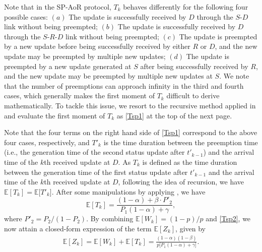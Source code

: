 \documentclass{IEEEtran}
\begin{document}
Note that in the SP-AoR protocol, $T_{k}$ behaves differently for the following four possible cases: $(a)$ The update is successfully received by $D$ through the $S$-$D$ link without being preempted; $(b)$ The update is successfully received by $D$ through the $S$-$R$-$D$ link without being preempted; $(c)$ The update is preempted by a new update before being successfully received by either $R$ or $D$, and the new update may be preempted by multiple new updates; $(d)$ The update is preempted by a new update generated at $S$ after being successfully received by $R$, and the new update may be preempted by multiple new updates at $S$. We note that the number of preemptions can approach infinity in the third and fourth cases, which generally makes the first moment of $T_{k}$ difficult to derive mathematically. To tackle this issue, we resort to the recursive method applied in \cite{b8} and evaluate the first moment of $T_{k}$ as \eqref{Tsp1} at the top of the next page.



Note that the four terms on the right hand side of \eqref{Tsp1} correspond to the above four cases, respectively, and $T'_{k}$ is the time duration between the preemption time (i.e., the generation time of the second status update after $t'_{k-1}$) and the arrival time of the $k$th received update at $D$. As $T_{k}$ is defined as the time duration between the generation time of the first status update after $t'_{k-1}$ and the arrival time of the $k$th received update at $D$, following the idea of recursion, we have $\mathbb{E}[T_{k}]=\mathbb{E}\big[T'_{k}\big]$. After some manipulations by applying \cite[Eqs. (0.112) and (0.113)]{b7}, we have
\begin{equation}\label{Tsp2}
\mathbb{E}[T_{k}]=\frac{(1-\alpha)+\beta\cdot P'_{2}}{P_{1}(1-\alpha)+\gamma},
\end{equation}
where $P'_{2} = P_{2}/(1-P_{2})$. 
By combining $\mathbb{E}[W_{k}]=(1-p)/p$ and \eqref{Tsp2}, we now attain a closed-form expression of the term $\mathbb{E}[Z_{k}]$, given by
\begin{equation}\label{Zsp}
\begin{aligned}
\mathbb{E}[Z_{k}]=\mathbb{E}[W_{k}]+\mathbb{E}[T_{k}]=\frac{(1-\alpha)(1-\beta)}{p\big[P_{1}(1-\alpha)+\gamma\big]}.
\end{aligned}
\end{equation}
\end{document}
